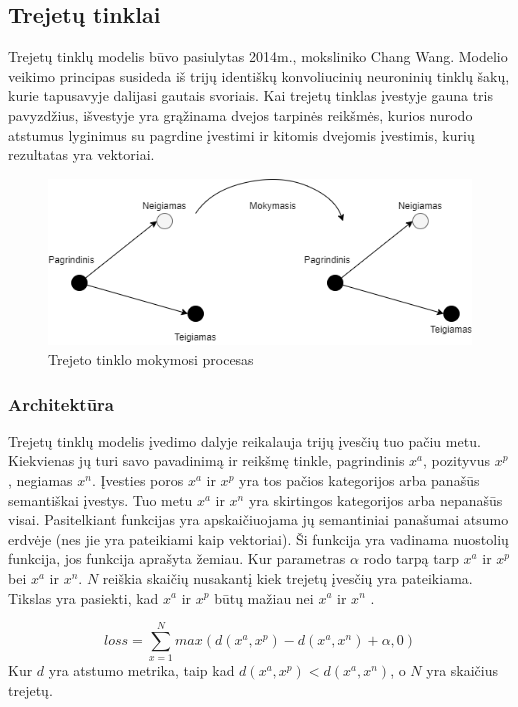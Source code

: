 \documentclass{VUMIFPSkursinis}
\begin{document}
\subsection{Trejetų tinklai}
Trejetų tinklų modelis būvo pasiulytas 2014m., moksliniko Chang Wang\cite{Learning_fine_grained_image}. Modelio veikimo principas susideda iš trijų identiškų konvoliucinių neuroninių tinklų šakų, kurie tapusavyje dalijasi gautais svoriais. Kai trejetų tinklas įvestyje gauna tris pavyzdžius, išvestyje yra grąžinama dvejos tarpinės reikšmės, kurios nurodo atstumus lyginimus su pagrdine įvestimi ir kitomis dvejomis įvestimis, kurių rezultatas yra vektoriai.
\begin{figure}[H]
\centering
\includegraphics[scale=0.5]{img/Triplet_network}
\caption{Trejeto tinklo mokymosi procesas \cite{Improved_triplet_network}} %
\label{img:mlp}
\end{figure}
\pagebreak

\subsubsection{Architektūra}
Trejetų tinklų modelis įvedimo dalyje reikalauja trijų įvesčių tuo pačiu metu. Kiekvienas jų turi savo pavadinimą ir reikšmę tinkle, pagrindinis $x^a$, pozityvus $x^p$, negiamas $x^n$. Įvesties poros $x^a$ ir $x^p$ yra tos pačios kategorijos arba panašūs semantiškai įvestys. Tuo metu $x^a$ ir $x^n$ yra skirtingos kategorijos arba nepanašūs visai. Pasitelkiant funkcijas yra apskaičiuojama jų semantiniai panašumai atsumo erdvėje (nes jie yra pateikiami kaip vektoriai). Ši funkcija yra vadinama nuostolių funkcija, jos funkcija aprašyta žemiau. Kur parametras $\alpha$ rodo tarpą tarp $x^a$ ir $x^p$ bei $x^a$ ir $x^n$. $N$ reiškia skaičių nusakantį kiek trejetų įvesčių yra pateikiama. Tikslas yra pasiekti, kad $x^a$ ir $x^p$ būtų mažiau nei $x^a$ ir $x^n$ \cite{Face_recognition}.

\[loss = \sum_{x=1}^{N} max(d(x^a, x^p) - d(x^a, x^n) + \alpha, 0)\]
Kur $d$ yra atstumo metrika, taip kad $d(x^a, x^p) < d(x^a, x^n)$, o $N$ yra skaičius trejetų.
\end{document}
